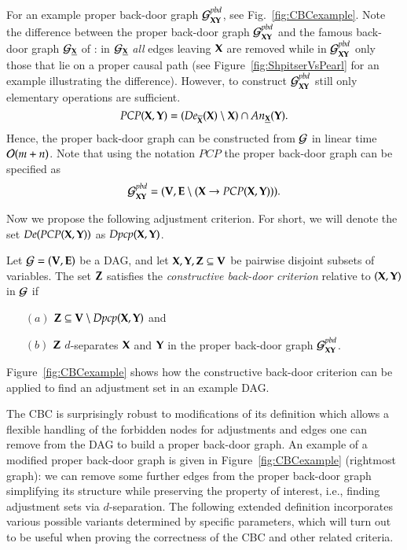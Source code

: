 For an example proper back-door graph  ${\cal G}^{pbd}_{{\bf X}{\bf Y}}$, see Fig.~\ref{fig:CBCexample}.
Note the difference between the 
proper back-door graph ${\cal G}^{pbd}_{{\bf X}{\bf Y}}$ and the famous back-door 
graph ${\cal G}_{\underline{{\bf X}}}$ of \cite{Pearl2009}: in ${\cal G}_{\underline{{\bf X}}}$ \emph{all} 
edges leaving ${\bf X}$ are removed while in ${\cal G}^{pbd}_{{\bf X}{\bf Y}}$ only those 
that lie on a proper causal path (see Figure~\ref{fig:ShpitserVsPearl} 
for an example illustrating the difference).
However, to construct ${\cal G}^{pbd}_{{\bf X}{\bf Y}}$ still only elementary 
operations are sufficient. 
\begin{equation}\label{eq:pcp:contsr:def}
  \textit{PCP}({\bf X},{\bf Y}) =   
        (\textit{De}_{\overline{{\bf X}}}({\bf X}) \setminus {\bf X}) \cap \textit{An}_{\underline{{\bf X} }}({\bf Y}).
\end{equation}
%
%
Hence, the proper back-door graph  can be constructed from ${\cal G}$ in linear time
${\cal O}(m+n)$. Note that using the notation $\textit{PCP}$ the proper back-door graph can be specified as 
$${\cal G}^{pbd}_{{\bf X}{\bf Y}} = ({\bf V},{\bf E} \setminus ({\bf X} \to \textit{PCP}({\bf X},{\bf Y}) )).$$



Now we propose the following adjustment criterion. 
For short, we will denote the set $\textit{De}(\textit{PCP}({\bf X},{\bf Y}))$ as $\textit{Dpcp}({\bf X},{\bf Y})$.

\begin{definition}\label{def:ac:general:bdc}
Let ${\cal G} = ({\bf V},{\bf E})$ be a DAG, and 
let ${\bf X},{\bf Y},{\bf Z} \subseteq {\bf V}$ be pairwise disjoint subsets of variables. 
The set ${\bf Z}$ satisfies the 
%
\emph{constructive back-door criterion}
relative to $({\bf X}, {\bf Y})$ in ${\cal G}$  if
\begin{enumerate}
  \item[$(a)$] ${\bf Z} \subseteq {\bf V} \setminus \textit{Dpcp}({\bf X},{\bf Y})$ and 
  \item[$(b)$] 
    ${\bf Z}$ $d$-separates ${\bf X}$ and ${\bf Y}$ in the proper back-door graph 
      ${\cal G}^{pbd}_{{\bf X}{\bf Y}}$.
\end{enumerate}
\end{definition}
%
%
Figure~\ref{fig:CBCexample} shows how the constructive back-door criterion  can be applied 
to find an adjustment set in an example DAG. 


The CBC is surprisingly robust to modifications of its definition which 
allows a flexible handling of the forbidden nodes for adjustments and 
edges one can remove from the DAG to build a proper back-door graph.
An example of a modified proper back-door graph is given in Figure~\ref{fig:CBCexample} (rightmost graph):
we can remove some further edges from the proper back-door graph simplifying its structure 
while preserving the property of interest, i.e., finding adjustment sets via $d$-separation. 
The following extended definition incorporates various possible variants determined by specific parameters, which will turn out to be useful when proving the correctness of the CBC and other related criteria.


